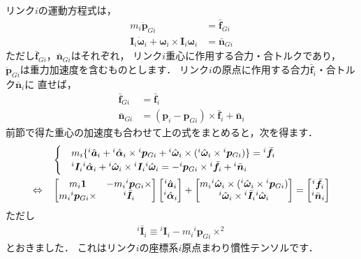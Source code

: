 ﻿\documentclass[a4paper]{jsarticle}
\begin{document}
リンク$i$の運動方程式は，
\begin{align}
m_{i}\ddot{\bm{p}}_{Gi}&=\bar{\bm{f}}_{Gi}
 \label{eq:eqm_lin} \\
\bm{I}_{i}\dot{\bm{\omega}}_{i}+
\bm{\omega}_{i}\times\bm{I}_{i}\bm{\omega}_{i}&=\bar{\bm{n}}_{Gi}
 \label{eq:eqm_ang}
\end{align}
ただし$\bar{\bm{f}}_{Gi}$，$\bar{\bm{n}}_{Gi}$はそれぞれ，
リンク$i$重心に作用する合力・合トルクであり，
$\ddot{\bm{p}}_{Gi}$は重力加速度を含むものとします．
リンク$i$の原点に作用する合力$\bar{\bm{f}}_{i}$・合トルク$\bar{\bm{n}}_{i}$に
直せば，
\begin{align}
\bar{\bm{f}}_{Gi}&=\bar{\bm{f}}_{i}
 \label{eq:force_g} \\
\bar{\bm{n}}_{Gi}&=(\bm{p}_{i}-\bm{p}_{Gi})\times\bar{\bm{f}}_{i}+\bar{\bm{n}}_{i}
 \label{eq:torque_g}
\end{align}
前節で得た重心の加速度も合わせて上の式をまとめると，次を得ます．
\begin{align}
&\begin{cases}
&m_{i}\{
{}^{i}\hat{\bm{a}}_{i}
 +{}^{i}\hat{\bm{\alpha}}_{i}\times{}^{i}\bm{p}_{Gi}
 +{}^{i}\hat{\bm{\omega}}_{i}\times({}^{i}\hat{\bm{\omega}}_{i}\times{}^{i}\bm{p}_{Gi})\}={}^{i}\bar{\bm{f}}_{i}
 \\
&{}^{i}\bm{I}_{i}{}^{i}\hat{\bm{\alpha}}_{i}+
{}^{i}\hat{\bm{\omega}}_{i}\times{}^{i}\bm{I}_{i}{}^{i}\hat{\bm{\omega}}_{i}
 =-{}^{i}\bm{p}_{Gi}\times{}^{i}\bar{\bm{f}}_{i}+{}^{i}\bar{\bm{n}}_{i}
\end{cases} \nonumber \\
\Leftrightarrow\quad&
\left[\begin{array}{@{}cc@{}}
m_{i}\bm{1} & -m_{i}{}^{i}\bm{p}_{Gi}\times \\
m_{i}{}^{i}\bm{p}_{Gi}\times & {}^{i}\bar{\bm{I}}_{i}
\end{array}\right]
\left[\begin{array}{@{}c@{}}
 {}^{i}\hat{\bm{a}}_{i} \\ {}^{i}\hat{\bm{\alpha}}_{i}
\end{array}\right]
+
\left[\begin{array}{@{}c@{}}
 m_{i}{}^{i}\hat{\bm{\omega}}_{i}\times({}^{i}\hat{\bm{\omega}}_{i}\times{}^{i}\bm{p}_{Gi}) \\
 {}^{i}\hat{\bm{\omega}}_{i}\times{}^{i}\bar{\bm{I}}_{i}{}^{i}\hat{\bm{\omega}}_{i}
\end{array}\right]
=
\left[\begin{array}{@{}c@{}}
 {}^{i}\bar{\bm{f}}_{i} \\ {}^{i}\bar{\bm{n}}_{i}
\end{array}\right]
\label{eq:eqm}
\end{align}
ただし
\begin{align}
{}^{i}\bar{\bm{I}}_{i}\equiv
 {}^{i}\bm{I}_{i}-m_{i}{}^{i}\bm{p}_{Gi}\times^{2}
 \label{eq:inertia_origin}
\end{align}
とおきました．
これはリンク$i$の座標系$i$原点まわり慣性テンソルです．
\end{document}
